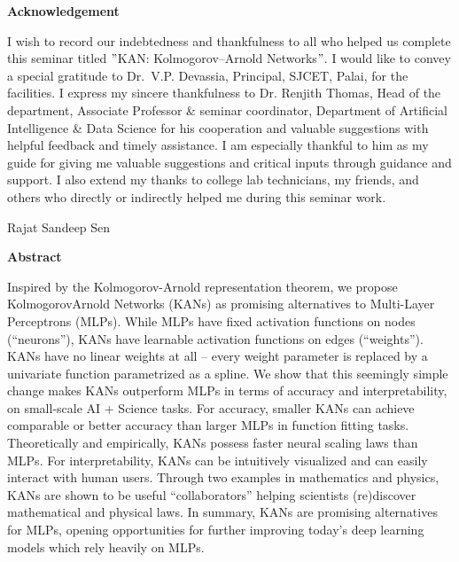 \newpage
\thispagestyle{empty}
\begin{center}
  \vspace*{1cm}
  \textbf{\large Acknowledgement}
\end{center}
I wish to record our indebtedness and thankfulness to all who helped us complete this seminar titled $"$KAN: Kolmogorov–Arnold Networks$"$. I would like to convey a special gratitude to Dr.~V.P. Devassia, Principal, SJCET, Palai, for the facilities. I express my sincere thankfulness to Dr. Renjith Thomas, Head of the department, Associate Professor \& seminar coordinator, Department of Artificial Intelligence \& Data Science for his cooperation and valuable suggestions with helpful feedback and timely assistance. I am especially thankful to him as my guide for giving me valuable suggestions and critical inputs through guidance and support. I also extend my thanks to college lab technicians, my friends, and others who directly or indirectly helped me during this seminar work.
 \\
\begin{flushright}
Rajat Sandeep Sen
\end{flushright}

\newpage
\thispagestyle{empty}
\begin{center}
  \textbf{\large Abstract}\\
\end{center}
  Inspired by the Kolmogorov-Arnold representation theorem, we propose KolmogorovArnold Networks (KANs) as promising alternatives to Multi-Layer Perceptrons (MLPs).
While MLPs have fixed activation functions on nodes (“neurons”), KANs have learnable
activation functions on edges (“weights”). KANs have no linear weights at all – every
weight parameter is replaced by a univariate function parametrized as a spline. We show
that this seemingly simple change makes KANs outperform MLPs in terms of accuracy
and interpretability, on small-scale AI + Science tasks. For accuracy, smaller KANs can
achieve comparable or better accuracy than larger MLPs in function fitting tasks. Theoretically and empirically, KANs possess faster neural scaling laws than MLPs. For interpretability, KANs can be intuitively visualized and can easily interact with human users.
Through two examples in mathematics and physics, KANs are shown to be useful “collaborators” helping scientists (re)discover mathematical and physical laws. In summary, KANs
are promising alternatives for MLPs, opening opportunities for further improving today’s
deep learning models which rely heavily on MLPs.

